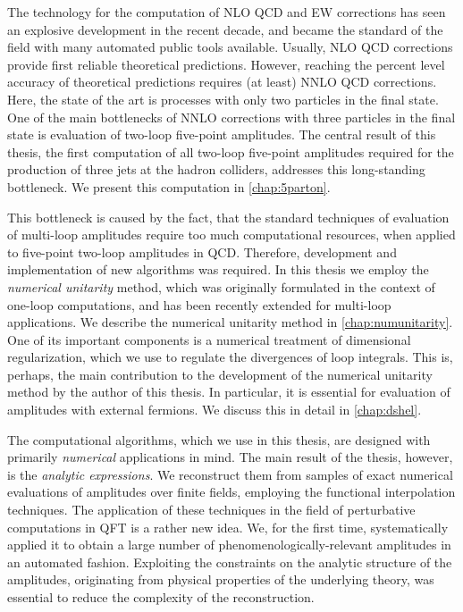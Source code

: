 The technology for the computation of NLO QCD and EW corrections has seen an explosive development
in the recent decade, and became the standard of the field with many automated public tools available.
Usually, NLO QCD corrections provide first reliable theoretical predictions.
However, reaching the percent level accuracy of theoretical predictions requires (at least) NNLO QCD corrections.
Here, the state of the art is processes with only two particles in the final state.
One of the main bottlenecks of NNLO corrections with three particles in the final state is evaluation of two-loop five-point amplitudes.
The central result of this thesis, the first computation of all two-loop five-point amplitudes required for the production
of three jets at the hadron colliders, addresses this long-standing bottleneck. We present this computation in  \cref{chap:5parton}.

This bottleneck is caused by the fact,
that the standard techniques of evaluation of multi-loop amplitudes require too much computational resources,
when applied to five-point two-loop amplitudes in QCD.
Therefore, development and implementation of new algorithms was required.
In this thesis we employ the \emph{numerical unitarity} method, which
was originally formulated in the context of one-loop computations,
and has been recently extended for multi-loop applications.
We describe the numerical unitarity method in \cref{chap:numunitarity}.
One of its important components is a numerical treatment of dimensional regularization, which we use to regulate the divergences of loop integrals.
This is, perhaps, the main contribution to the development of the numerical unitarity method by the author of this thesis.
In particular, it is essential for evaluation of amplitudes with external fermions.
We discuss this in detail in \cref{chap:dshel}.

The computational algorithms, which we use in this thesis, are designed with primarily \emph{numerical} applications in mind.
The main result of the thesis, however, is the \emph{analytic expressions}.
We reconstruct them from samples of exact numerical evaluations of amplitudes over finite fields,
employing the functional interpolation techniques.
The application of these techniques in the field of perturbative computations in QFT is a rather new idea.
We, for the first time, systematically applied it to obtain a large number of phenomenologically-relevant amplitudes in an automated fashion. 
Exploiting the constraints on the analytic structure of the amplitudes, originating
from physical properties of the underlying theory, was essential to reduce the complexity of the reconstruction.

